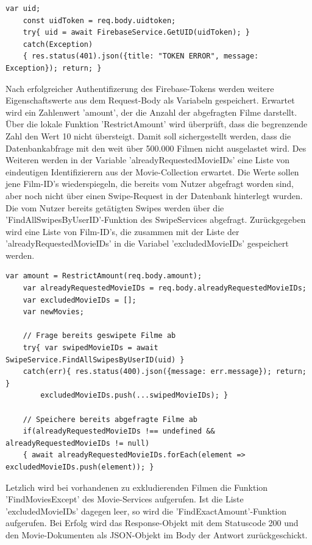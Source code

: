 \begin{lstlisting}[caption=Controller Firebase-Authentifizierung, label=lst:controllerfirebaseauth]
    var uid; 
    const uidToken = req.body.uidtoken;
    try{ uid = await FirebaseService.GetUID(uidToken); }
    catch(Exception)
    { res.status(401).json({title: "TOKEN ERROR", message: Exception}); return; }
\end{lstlisting}

\noindent
Nach erfolgreicher Authentifizerung des Firebase-Tokens werden weitere Eigenschaftswerte aus dem Request-Body als Variabeln gespeichert. Erwartet wird ein Zahlenwert 'amount', der die Anzahl der abgefragten Filme darstellt. Über die lokale Funktion 'RestrictAmount' wird überprüft, dass die begrenzende Zahl den Wert 10 nicht übersteigt. Damit soll sichergestellt werden, dass die Datenbankabfrage mit den weit über 500.000 Filmen nicht ausgelastet wird. Des Weiteren werden in der Variable 'alreadyRequestedMovieIDs' eine Liste von   eindeutigen Identifizierern aus der Movie-Collection erwartet. Die Werte sollen jene Film-ID's wiederspiegeln, die bereits vom Nutzer abgefragt worden sind, aber noch nicht über einen Swipe-Request in der Datenbank hinterlegt wurden. Die vom Nutzer bereits getätigten Swipes werden über die 'FindAllSwipesByUserID'-Funktion des SwipeServices abgefragt. Zurück\-gegeben wird eine Liste von Film-ID's, die zusammen mit der Liste der 'alreadyRequestedMovieIDs' in die Variabel 'excludedMovieIDs' gespeichert werden.

\begin{lstlisting}[caption=MovieController - RequestMovie - Excluded Movies, label=lst:MovieControllerExcludedMovies]
    var amount = RestrictAmount(req.body.amount);
    var alreadyRequestedMovieIDs = req.body.alreadyRequestedMovieIDs;
    var excludedMovieIDs = [];
    var newMovies;
    
    // Frage bereits geswipete Filme ab
    try{ var swipedMovieIDs = await SwipeService.FindAllSwipesByUserID(uid) }
    catch(err){ res.status(400).json({message: err.message}); return; }
        excludedMovieIDs.push(...swipedMovieIDs); }

    // Speichere bereits abgefragte Filme ab
    if(alreadyRequestedMovieIDs !== undefined && alreadyRequestedMovieIDs != null)
    { await alreadyRequestedMovieIDs.forEach(element => excludedMovieIDs.push(element)); }
\end{lstlisting}

\noindent
Letzlich wird bei vorhandenen zu exkludierenden Filmen die Funktion 'FindMoviesExcept' des Movie-Services aufgerufen.  Ist die Liste 'excludedMovieIDs' dagegen leer, so wird die 'Find\-ExactAmount'-Funktion aufgerufen. Bei Erfolg wird das Response-Objekt mit dem Statuscode 200 und den Movie-Dokumenten als JSON-Objekt im Body der Antwort zurückgeschickt.

